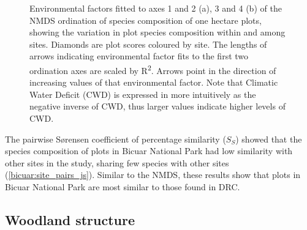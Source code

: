 \begin{refsection}
\begin{figure}[!h]
	\centering
    \qquad
{}%
\caption[NMDS ordination of species composition]{Environmental factors fitted to axes 1 and 2 (a), 3 and 4 (b) of the NMDS ordination of species composition of one hectare plots, showing the variation in plot species composition within and among sites. Diamonds are plot scores coloured by site. The lengths of arrows indicating environmental factor fits to the first two ordination axes are scaled by R\textsuperscript{2}. Arrows point in the direction of increasing values of that environmental factor. Note that Climatic Water Deficit (CWD) is expressed in more intuitively as the negative inverse of CWD, thus larger values indicate higher levels of CWD.}
\end{figure}

The pairwise S\o{}rensen coefficient of percentage similarity ($S_{S}$) showed that the species composition of plots in Bicuar National Park had low similarity with other sites in the study, sharing few species with other sites (\autoref{bicuar:site_pairs_js}). Similar to the NMDS, these results show that plots in Bicuar National Park are most similar to those found in DRC. 



\subsection{Woodland structure}
\label{bicuar:ssec:struc}


\end{refsection}
